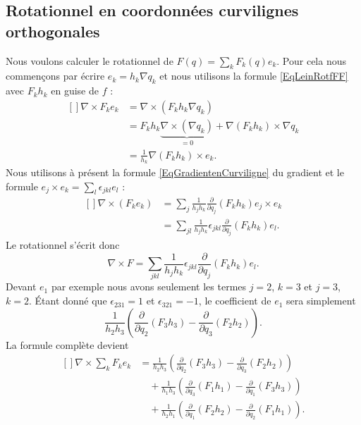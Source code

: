 \subsection{Rotationnel en coordonnées curvilignes orthogonales}

Nous voulons calculer le rotationnel de $F(q)=\sum_kF_k(q)e_k$. Pour cela nous commençons par écrire $e_k=h_k\nabla q_k$ et nous utilisons la formule \eqref{EqLeinRotfFF} avec $F_kh_k$ en guise de $f$ :
\begin{equation}
    \begin{aligned}[]
        \nabla\times F_ke_k&=\nabla\times(F_kh_k\nabla q_k)\\
        &=F_kh_k\underbrace{\nabla\times(\nabla q_k)}_{=0}+\nabla(F_kh_k)\times\nabla q_k\\
        &=\frac{1}{ h_k }\nabla(F_kh_k)\times e_k.
    \end{aligned}
\end{equation}
Nous utilisons à présent la formule \eqref{EqGradientenCurviligne} du gradient et le formule $e_j\times e_k=\sum_l\epsilon_{jkl}e_l$ :
\begin{equation}
    \begin{aligned}[]
        \nabla\times(F_ke_k)&=\sum_{j}\frac{1}{ h_jh_k }\frac{ \partial  }{ \partial q_j }(F_kh_k)e_j\times e_k\\
        &=\sum_{jl}\frac{1}{ h_jh_k }\epsilon_{jkl}\frac{ \partial  }{ \partial q_j }(F_kh_k)e_l.
    \end{aligned}
\end{equation}
Le rotationnel s'écrit donc
\begin{equation}
    \nabla\times F=\sum_{jkl}\frac{1}{ h_jh_k }\epsilon_{jkl}\frac{ \partial  }{ \partial q_j }(F_kh_k)e_l.
\end{equation}
Devant $e_1$ par exemple nous avons seulement les termes $j=2$, $k=3$ et $j=3$, $k=2$. Étant donné que $\epsilon_{231}=1$ et $\epsilon_{321}=-1$, le coefficient de $e_1$ sera simplement
\begin{equation}
    \frac{1}{ h_2h_3 }\left( \frac{ \partial  }{ \partial q_2 }(F_3h_3)-\frac{ \partial  }{ \partial q_3 }(F_2h_2) \right).
\end{equation}
La formule complète devient
\begin{equation}
    \begin{aligned}[]
        \nabla\times\sum_k F_ke_k&=\frac{1}{ h_2h_3 }\left( \frac{ \partial  }{ \partial q_2 }(F_3h_3)-\frac{ \partial  }{ \partial q_3 }(F_2h_2) \right)\\
            &\quad+\frac{1}{ h_1h_3 }\left( \frac{ \partial  }{ \partial q_3 }(F_1h_1)-\frac{ \partial  }{ \partial q_1 }(F_3h_3) \right)\\
            &\quad+\frac{1}{ h_2h_1 }\left( \frac{ \partial  }{ \partial q_1 }(F_2h_2)-\frac{ \partial  }{ \partial q_2 }(F_1h_1) \right).
    \end{aligned}
\end{equation}

